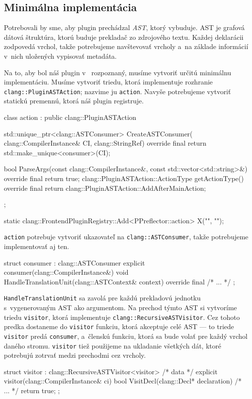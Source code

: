 \subsection{Minimálna implementácia}

Potrebovali by sme, aby plugin prechádzal \emph{AST}, ktorý \Clang{} vybuduje. AST je grafová dátová štruktúra, ktorú buduje prekladač zo zdrojového textu. Každej deklarácii zodpovedá vrchol, takže potrebujeme navštevovať vrcholy a~na základe informácií v~nich uložených vypisovať metadáta.

Na to, aby bol náš plugin v~\Clang{} rozpoznaný, musíme vytvoriť určitú minimálnu implementáciu. Musíme vytvoriť triedu, ktorá implementuje rozhranie \texttt{clang::PluginASTAction}; nazvime ju \texttt{action}. Navyše potrebujeme vytvoriť statickú premennú, ktorá náš plugin registruje.
\begin{code}[fontsize=\footnotesize]
class action : public clang::PluginASTAction
{   std::unique_ptr<clang::ASTConsumer> CreateASTConsumer(
        clang::CompilerInstance& CI,
        clang::StringRef) override final
    { return std::make_unique<consumer>(CI); }
    
    bool ParseArgs(const clang::CompilerInstance&,
                   const std::vector<std::string>&) override final
    { return true; }
    clang::PluginASTAction::ActionType getActionType() override final
    { return clang::PluginASTAction::AddAfterMainAction; }
};

static clang::FrontendPluginRegistry::Add<PPreflector::action> X("", "");
\end{code}

\texttt{action} potrebuje vytvoriť ukazovateľ na \texttt{clang::ASTConsumer}, takže potrebujeme implementovať aj ten.
\begin{code}[fontsize=\footnotesize]
struct consumer : clang::ASTConsumer
{
    explicit consumer(clang::CompilerInstance&) {}
    void HandleTranslationUnit(clang::ASTContext& context) override final
    { /* ... */ }
};
\end{code}

\texttt{HandleTranslationUnit} sa zavolá pre každú prekladovú jednotku s~vygenerovaným AST ako argumentom. Na prechod týmto AST si vytvoríme triedu \texttt{visitor}, ktorá implementuje \texttt{clang::RecursiveASTVisitor}. Cez tohoto predka dostaneme do \texttt{visitor} funkciu, ktorá akceptuje celé AST --- to triede \texttt{visitor} predá \texttt{consumer}, a~členskú funkciu, ktorá sa bude volať pre každý vrchol daného stromu. \texttt{visitor} tiež použijeme na ukladanie všetkých dát, ktoré potrebujú zotrvať medzi prechodmi cez vrcholy.
\begin{code}[fontsize=\footnotesize]
struct visitor : clang::RecursiveASTVisitor<visitor>
{   /* data */
    explicit visitor(clang::CompilerInstance& ci) {}
    bool VisitDecl(clang::Decl* declaration) { /* ... */ return true; }
};
\end{code}

